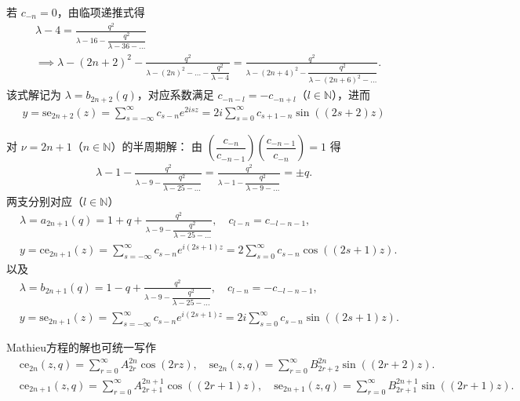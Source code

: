 若 \(c_{-n} = 0\)，由临项递推式得
\begin{align*}
	 & \lambda - 4 = \frac{q^2}{\lambda - 16 - \dfrac{q^2}{\lambda - 36 - \dots}}                                                                                                      \\
	 & \implies \lambda - (2n + 2)^2 - \frac{q^2}{\lambda - (2n)^2 - \dots - \dfrac{q^2}{\lambda - 4}} = \frac{q^2}{\lambda - (2n + 4)^2 - \dfrac{q^2}{\lambda - (2n + 6)^2 - \dots}}.
\end{align*}
该式解记为 \(\lambda = b_{2n+2}(q)\)，对应系数满足 \(c_{-n-l} = -c_{-n+l}\)（\(l \in \mathbb{N}\)），进而
\begin{align*}
	y = \mathrm{se}_{2n+2}(z) = \sum_{s=-\infty}^{\infty} c_{s-n} e^{2isz} = 2i \sum_{s=0}^{\infty} c_{s+1-n} \sin((2s + 2)z)
\end{align*}

对 \(\nu = 2n + 1\)（\(n \in \mathbb{N}\)）的半周期解：
由 \(\left( \dfrac{c_{-n}}{c_{-n-1}} \right) \left( \dfrac{c_{-n-1}}{c_{-n}} \right) = 1\) 得
\begin{align*}
	\lambda - 1 - \frac{q^2}{\lambda - 9 - \dfrac{q^2}{\lambda - 25 - \dots}} = \frac{q^2}{\lambda - 1 - \dfrac{q^2}{\lambda - 9 - \dots}} = \pm q.
\end{align*}
两支分别对应（\(l \in \mathbb{N}\)）
\begin{align*}
	 & \lambda = a_{2n+1}(q) = 1 + q + \frac{q^2}{\lambda - 9 - \dfrac{q^2}{\lambda - 25 - \dots}}, \quad c_{l-n} = c_{-l-n-1},      \\
	 & y = \mathrm{ce}_{2n+1}(z) = \sum_{s=-\infty}^{\infty} c_{s-n} e^{i(2s + 1)z} = 2 \sum_{s=0}^{\infty} c_{s-n} \cos((2s + 1)z).
\end{align*}
以及
\begin{align*}
	 & \lambda = b_{2n+1}(q) = 1 - q + \frac{q^2}{\lambda - 9 - \dfrac{q^2}{\lambda - 25 - \dots}}, \quad c_{l-n} = -c_{-l-n-1},      \\
	 & y = \mathrm{se}_{2n+1}(z) = \sum_{s=-\infty}^{\infty} c_{s-n} e^{i(2s + 1)z} = 2i \sum_{s=0}^{\infty} c_{s-n} \sin((2s + 1)z).
\end{align*}

Mathieu方程的解也可统一写作
\begin{align*}
	 & \mathrm{ce}_{2n}(z, q) = \sum_{r=0}^{\infty} A_{2r}^{2n} \cos(2rz), \quad
	\mathrm{se}_{2n}(z, q) = \sum_{r=0}^{\infty} B_{2r+2}^{2n} \sin((2r + 2)z).              \\
	 & \mathrm{ce}_{2n+1}(z, q) = \sum_{r=0}^{\infty} A_{2r+1}^{2n+1} \cos((2r + 1)z), \quad
	\mathrm{se}_{2n+1}(z, q) = \sum_{r=0}^{\infty} B_{2r+1}^{2n+1} \sin((2r + 1)z).
\end{align*}

